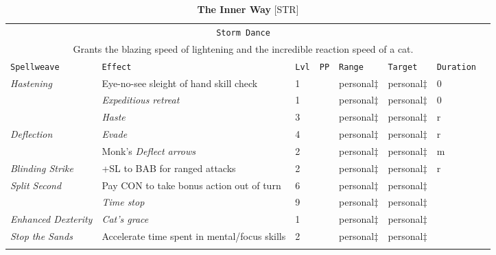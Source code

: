\documentclass[10pt,a4paper]{article}
\begin{document}
\newpage
\begin{table}[htbp!]
\caption*{\textbf{\Large{The Inner Way}} [STR]}
\begin{tabular}{llllllll}
	\multicolumn{7}{c}{\texttt{Storm Dance}}\\
	\multicolumn{7}{c}{Grants the blazing speed of lightening and the incredible reaction speed of a cat.}\\
	\hline 
	\texttt{Spellweave} & \texttt{Effect} & \texttt{Lvl} & \texttt{PP} & \texttt{Range} & \texttt{Target} & \texttt{Duration} \\
    \hline
    \multirow{1}{*}{\textit{Hastening}} & Eye-no-see sleight of hand skill check & 1 && personal$\ddagger$ & personal$\ddagger$ & 0\\
    									& \textit{Expeditious retreat} & 1 && personal$\ddagger$ & personal$\ddagger$ & 0 \\
    									& \textit{Haste} & 3 && personal$\ddagger$ & personal$\ddagger$ & r\\
	\hline
    \multirow{1}{*}{\textit{Deflection}} & \textit{Evade} & 4 && personal$\ddagger$ & personal$\ddagger$ & r\\
    									& Monk's \textit{Deflect arrows} & 2 && personal$\ddagger$ & personal$\ddagger$ & m\\
    	\hline
    \multirow{1}{*}{\textit{Blinding Strike}} & +SL to BAB for ranged attacks & 2 && personal$\ddagger$ & personal$\ddagger$ & r\\
    \hline
    \multirow{1}{*}{\textit{Split Second}} & Pay CON to take bonus action out of turn & 6 && personal$\ddagger$ & personal$\ddagger$\\
    									   & \textit{Time stop} & 9 && personal$\ddagger$ & personal$\ddagger$\\
    	\hline
    \multirow{1}{*}{\textit{Enhanced Dexterity}} & \textit{Cat's grace} & 1 && personal$\ddagger$ & personal$\ddagger$\\
    	\hline
    \multirow{1}{*}{\textit{Stop the Sands}} & Accelerate time spent in mental/focus skills & 2 && personal$\ddagger$ & personal$\ddagger$\\
    &&&&&&\\
    

\end{tabular}
\end{table}
\end{document}
